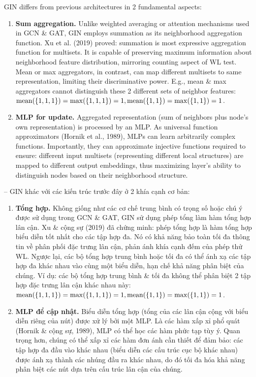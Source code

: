 \documentclass{article}
\begin{document}
\begin{itemize}
\begin{itemize}
\begin{itemize}
            GIN differs from previous architectures in 2 fundamental aspects:
            \begin{enumerate}
                \item {\bf Sum aggregation.} Unlike weighted averaging or attention mechanisms used in GCN \& GAT, GIN employs summation as its neighborhood aggregation function. Xu et al. (2019) proved: summation is most expressive aggregation function for multisets. It is capable of preserving maximum information about neighborhood feature distribution, mirroring counting aspect of WL test. Mean or max aggregators, in contrast, can map different multisets to same representation, limiting their discriminative power. E.g., mean \& max aggregators cannot distinguish these 2 different sets of neighbor features: ${\rm mean}(\{1,1,1\}) = \max(\{1,1,1\}) = 1,{\rm mean}(\{1,1\}) = \max(\{1,1\}) = 1$.
                \item {\bf MLP for update.} Aggregated representation (sum of neighbors plus node's own representation) is processed by an MLP. As universal function approximators (Hornik et al., 1989), MLPs can learn arbitrarily complex functions. Importantly, they can approximate injective functions required to ensure: different input multisets (representing different local structures) are mapped to different output embeddings, thus maximizing layer's ability to distinguish nodes based on their neighborhood structure.
            \end{enumerate}
            -- GIN khác với các kiến trúc trước đây ở 2 khía cạnh cơ bản:
            \begin{enumerate}
                \item {\bf Tổng hợp.} Không giống như các cơ chế trung bình có trọng số hoặc chú ý được sử dụng trong GCN \& GAT, GIN sử dụng phép tổng làm hàm tổng hợp lân cận. Xu \& cộng sự (2019) đã chứng minh: phép tổng hợp là hàm tổng hợp biểu diễn tốt nhất cho các tập hợp đa. Nó có khả năng bảo toàn tối đa thông tin về phân phối đặc trưng lân cận, phản ánh khía cạnh đếm của phép thử WL. Ngược lại, các bộ tổng hợp trung bình hoặc tối đa có thể ánh xạ các tập hợp đa khác nhau vào cùng một biểu diễn, hạn chế khả năng phân biệt của chúng. Ví dụ: các bộ tổng hợp trung bình \& tối đa không thể phân biệt 2 tập hợp đặc trưng lân cận khác nhau này: ${\rm mean}(\{1,1,1\}) = \max(\{1,1,1\}) = 1,{\rm mean}(\{1,1\}) = \max(\{1,1\}) = 1$.
                \item {\bf MLP để cập nhật.} Biểu diễn tổng hợp (tổng của các lân cận cộng với biểu diễn riêng của nút) được xử lý bởi một MLP. Là các hàm xấp xỉ phổ quát (Hornik \& cộng sự, 1989), MLP có thể học các hàm phức tạp tùy ý. Quan trọng hơn, chúng có thể xấp xỉ các hàm đơn ánh cần thiết để đảm bảo: các tập hợp đa đầu vào khác nhau (biểu diễn các cấu trúc cục bộ khác nhau) được ánh xạ thành các nhúng đầu ra khác nhau, do đó tối đa hóa khả năng phân biệt các nút dựa trên cấu trúc lân cận của chúng.

\end{enumerate}
\end{itemize}
\end{itemize}
\end{itemize}
\end{document}
